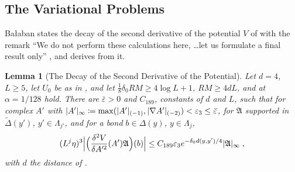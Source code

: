 \documentclass[11pt]{preprint}
\DeclarePairedDelimiter{\abs}{\lvert}{\rvert}
\numberwithin{equation}{section}
\newtheorem{lemma}{Lemma}[section]
\theoremstyle{definition}
\theoremstyle{remark}
\theoremstyle{plain}
\begin{document}
\subsection{The Variational Problems}

Ba{\l}aban states the decay \cite[(189), p.~308]{BalabanVAR} of the second derivative of the potential $V$ of \cite[(80)]{BalabanVAR} with the remark ``We do not perform these calculations here, \ldots let us formulate a final result only'' \cite[p.~308, ll.~28--30]{BalabanVAR}, and derives \cite[(190)]{BalabanVAR} from it.

\begin{lemma}[The Decay of the Second Derivative of the Potential]\label{lem:var-189}
Let $d = 4$, $L \geq 5$, let $U_0$ be as in \cite[Sects.~B--D]{BalabanVAR}, and let $\frac18\delta_0RM \geq 4\log L + 1$, $RM \geq 4dL$, and \cite[(2.59)]{BalabanPRT2} at $\alpha = 1/128$ hold. There are $\bar\varepsilon > 0$ and $C_{189}$, constants of $d$ and $L$, such that for complex $A'$ with $\abs{A'}_\infty \coloneqq \max(\abs{A'}_{(-1)}, \abs{\nabla A'}_{(-2)}) < \varepsilon_3 \leq \bar\varepsilon$, for $\mathfrak A$ supported in $\tilde\Delta(y')$, $y' \in \Lambda_{j'}$, and for a bond $b \in \Delta(y)$, $y \in \Lambda_j$,
\begin{equation}\label{eq:var-189}
    (L^j\eta)^3\Bigl\lvert\Bigl(\frac{\delta^2V}{\delta A'^2}(A')\mathfrak A\Bigr)(b)\Bigr\rvert \leq C_{189}\varepsilon_3e^{-\delta_0d(y,y')/4}\abs{\mathfrak A}_\infty\;,
\end{equation}
with $d$ the distance of \cite[(2.46), p.~231]{BalabanPRT2}.
\end{lemma}
\end{document}
